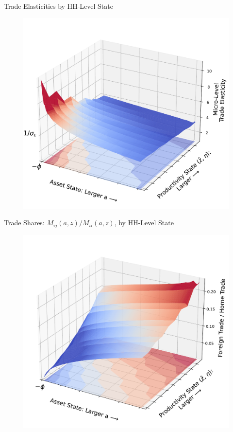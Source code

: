 \documentclass[9pt,pdftex,aspectratio=1610]{beamer}
\theoremstyle{definition}
\begin{document}
\begin{frame}[t]{Trade Elasticities by HH-Level State}
\vspace{-.5cm}
\begin{figure}[t]
\centerline{
\includegraphics[scale = 0.5]{../notes/figures/micro-elasticity.pdf}}
\end{figure}
\end{frame}


\begin{frame}[t]{Trade Shares: $M_{ij}(a,z) / M_{ii}(a,z)$, by HH-Level State}
\vspace{-.5cm}
\begin{figure}[t]
\centerline{
\includegraphics[scale = 0.5]{../notes/figures/trade-share.pdf}}
\end{figure}
\end{frame}
\end{document}
